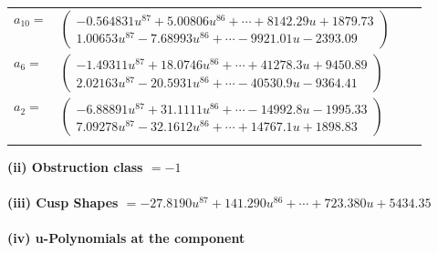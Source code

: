 \documentclass[1p]{elsarticle_modified}
\theoremstyle{definition}
\begin{document}
\begin{tabular}{m{7pt} m{180pt} m{7pt} m{180pt} }
\flushright $a_{10}=$&$\begin{pmatrix}-0.564831 u^{87}+5.00806 u^{86}+\cdots+8142.29 u+1879.73\\1.00653 u^{87}-7.68993 u^{86}+\cdots-9921.01 u-2393.09\end{pmatrix}$ \\
\flushright $a_{6}=$&$\begin{pmatrix}-1.49311 u^{87}+18.0746 u^{86}+\cdots+41278.3 u+9450.89\\2.02163 u^{87}-20.5931 u^{86}+\cdots-40530.9 u-9364.41\end{pmatrix}$ \\
\flushright $a_{2}=$&$\begin{pmatrix}-6.88891 u^{87}+31.1111 u^{86}+\cdots-14992.8 u-1995.33\\7.09278 u^{87}-32.1612 u^{86}+\cdots+14767.1 u+1898.83\end{pmatrix}$\\&\end{tabular}
\flushleft \textbf{(ii) Obstruction class $= -1$}\\~\\
\flushleft \textbf{(iii) Cusp Shapes $= -27.8190 u^{87}+141.290 u^{86}+\cdots+723.380 u+5434.35$}\\~\\
\newpage\renewcommand{\arraystretch}{1}
\flushleft \textbf{(iv) u-Polynomials at the component}\newline \\
\end{document}
